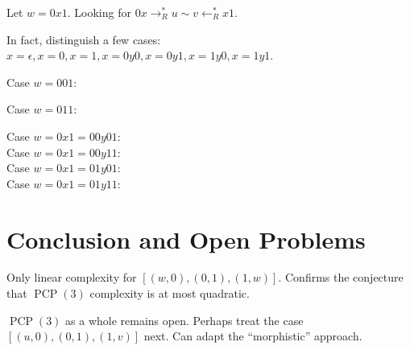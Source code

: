 \documentclass{llncs}
\newcommand{\PCP}{\operatorname{PCP}}
\newcommand{\from}{\leftarrow}
\begin{document}
Let $w = 0x1$. Looking for $0x \to_R^* u \sim v \from_R^* x1$.

In fact, distinguish a few cases:
$x = \epsilon, x=0, x=1, x=0y0, x=0y1, x=1y0, x=1y1$.


\newcommand{\mto}{\rightarrow_R}
\newcommand{\msim}{\sim_I}
\newcommand{\mfrom}{\leftarrow_R}

\begin{minipage}{0.5\textwidth}
Case $w=001$: \[  \]
\end{minipage}%
\begin{minipage}{0.5\textwidth}
Case $w=011$: \[  \]
\end{minipage}

Case $w = 0x1 = 00y01$: \[  \]
Case $w=0x1=00y11$: \[  \]
Case $w=0x1=01y01$: \[  \]
Case $w = 0x1 = 01y11$: \[  \]


\section{Conclusion and Open Problems}

Only linear complexity for $[(w,0),(0,1),(1,w)]$.
Confirms the conjecture that $\PCP(3)$ complexity is at most quadratic.

$\PCP(3)$ as a whole remains open.
Perhaps treat the case $[(u,0),(0,1),(1,v)]$ next.
Can adapt the ``morphistic'' approach.
\end{document}

